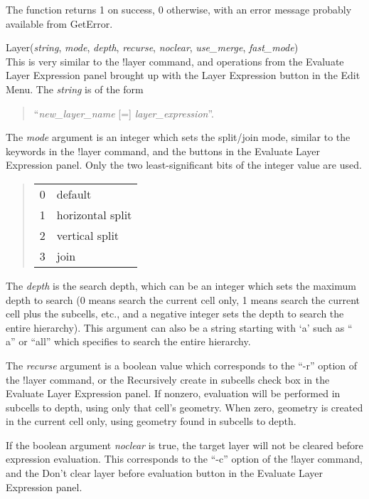 \begin{description}
The function returns 1 on success, 0 otherwise, with an error message
probably available from {\vt GetError}.

\item{\vt Layer({\it string}, {\it mode\/}, {\it depth}, {\it recurse\/},
 {\it noclear\/}, {\it use\_merge\/}, {\it fast\_mode\/})}\\
This is very similar to the {\cb !layer} command, and operations from
the {\cb Evaluate Layer Expression} panel brought up with the {\cb
Layer Expression} button in the {\cb Edit Menu}.  The {\it string} is
of the form
\begin{quote}
  ``{\it new\_layer\_name} [=] {\it layer\_expression}''.
\end{quote}

The {\it mode} argument is an integer which sets the split/join mode,
similar to the keywords in the {\cb !layer} command, and the buttons
in the {\cb Evaluate Layer Expression} panel.  Only the two
least-significant bits of the integer value are used.

\begin{quote}
\begin{tabular}{ll}
0 & default\\
1 & horizontal split\\
2 & vertical split\\
3 & join\\
\end{tabular}
\end{quote}

The {\it depth} is the search depth, which can be an integer which
sets the maximum depth to search (0 means search the current cell
only, 1 means search the current cell plus the subcells, etc., and a
negative integer sets the depth to search the entire hierarchy).  This
argument can also be a string starting with `{\vt a}' such as ``{\vt
a}'' or ``{\vt all}'' which specifies to search the entire hierarchy.

The {\it recurse} argument is a boolean value which corresponds to the
``{\vt -r}'' option of the {\cb !layer} command, or the {\cb
Recursively create in subcells} check box in the {\cb Evaluate Layer
Expression} panel.  If nonzero, evaluation will be performed in
subcells to depth, using only that cell's geometry.  When zero,
geometry is created in the current cell only, using geometry found in
subcells to depth.

If the boolean argument {\it noclear} is true, the target layer will
not be cleared before expression evaluation.  This corresponds to the
``{\vt -c}'' option of the {\cb !layer} command, and the {\cb Don't
clear layer before evaluation} button in the {\cb Evaluate Layer
Expression} panel.


\end{description}
